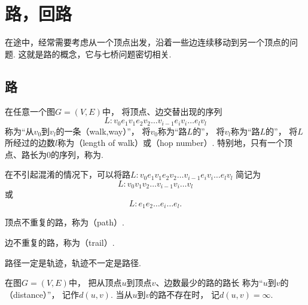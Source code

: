 \section{路，回路}
在途中，经常需要考虑从一个顶点出发，沿着一些边连续移动到另一个顶点的问题.
这就是路的概念，它与七桥问题密切相关.

\subsection{路}
\begin{definition}
在任意一个图\(G = (V,E)\)中，
将顶点、边交替出现的序列\begin{equation*}
	L: v_0 e_1 v_1 e_2 v_2 \dotso v_{i-1} e_i v_i \dotso e_l v_l
\end{equation*}称为“从\(v_0\)到\(v_l\)的一条（walk,way）”，
将\(v_0\)称为“路\(L\)的”，
将\(v_l\)称为“路\(L\)的”，
将\(L\)所经过的边数\(l\)称为（length of walk）或（hop number）.
特别地，只有一个顶点、路长为\(0\)的序列，称为.
\end{definition}

在不引起混淆的情况下，可以将路\(L: v_0 e_1 v_1 e_2 v_2 \dotso v_{i-1} e_i v_i \dotso e_l v_l\)
简记为\begin{equation*}
	L: v_0 v_1 v_2 \dotso v_{i-1} v_i \dotso v_l
\end{equation*}
或\begin{equation*}
	L: e_1 e_2 \dotso e_i \dotso e_l.
\end{equation*}

\begin{definition}
顶点不重复的路，称为（path）.
\end{definition}

\begin{definition}
边不重复的路，称为（trail）.
\end{definition}

\begin{proposition}
路径一定是轨迹，轨迹不一定是路径.
\end{proposition}

\begin{definition}
在图\(G = (V,E)\)中，
把从顶点\(u\)到顶点\(v\)、边数最少的路的路长
称为“\(u\)到\(v\)的（distance）”，
记作\(d(u,v)\).
当从\(u\)到\(v\)的路不存在时，
记\(d(u,v) = \infty\).
\end{definition}

